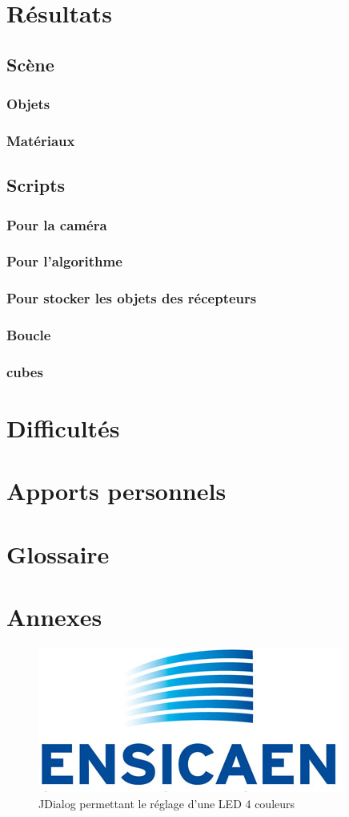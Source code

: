 \documentclass[a4paper,11pt]{myreport}
\begin{document}
\newpage

\chapter{Résultats}

	\section{Scène}
	\subsection{Objets}
	\subsection{Matériaux}
	\section{Scripts}
	\subsection{Pour la caméra}
	\subsection{Pour l'algorithme}
	\subsection{Pour stocker les objets des récepteurs}
	\subsection{Boucle}
	\subsection{cubes}

\chapter{Difficultés}

\chapter{Apports personnels}

\chapter{Glossaire}

\chapter{Annexes}

\begin{figure}[h]
	\includegraphics[scale=0.70]{./images/LogoEnsicaenSansTexte.jpg}
	\caption{JDialog permettant le réglage d'une LED 4 couleurs}
\end{figure}
\listoffigures
\end{document}
